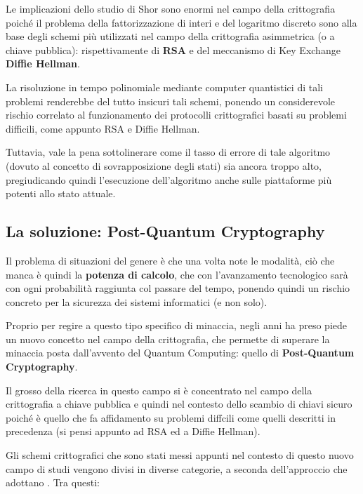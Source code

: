\documentclass[a4paper, 12pt, oneside]{article}
\theoremstyle{definition}
\begin{document}
Le implicazioni dello studio di Shor sono enormi nel campo della crittografia poiché il problema della fattorizzazione di interi e del logaritmo discreto sono alla base degli schemi più utilizzati nel campo della crittografia asimmetrica (o a chiave pubblica): rispettivamente di \textbf{RSA} e del meccanismo di Key Exchange \textbf{Diffie Hellman}.

La risoluzione in tempo polinomiale mediante computer quantistici di tali problemi renderebbe del tutto insicuri tali schemi, ponendo un considerevole rischio correlato al funzionamento dei protocolli crittografici basati su problemi difficili, come appunto RSA e Diffie Hellman.

Tuttavia, vale la pena sottolinerare come il tasso di errore di tale algoritmo (dovuto al concetto di sovrapposizione degli stati) sia ancora troppo alto, pregiudicando quindi l'esecuzione dell'algoritmo anche sulle piattaforme più potenti allo stato attuale.

\newpage

\subsection{La soluzione: Post-Quantum Cryptography}
Il problema di situazioni del genere è che una volta note le modalità, ciò che manca è quindi la \textbf{potenza di calcolo}, che con l'avanzamento tecnologico sarà con ogni probabilità raggiunta col passare del tempo, ponendo quindi un rischio concreto per la sicurezza dei sistemi informatici (e non solo).

Proprio per regire a questo tipo specifico di minaccia, negli anni ha preso piede un nuovo concetto nel campo della crittografia, che permette di superare la minaccia posta dall'avvento del Quantum Computing: quello di \textbf{Post-Quantum Cryptography}.

Il grosso della ricerca in questo campo si è concentrato nel campo della crittografia a chiave pubblica e quindi nel contesto dello scambio di chiavi sicuro poiché è quello che fa affidamento su problemi diffcili come quelli descritti in precedenza (si pensi appunto ad RSA ed a Diffie Hellman).

Gli schemi crittografici che sono stati messi appunti nel contesto di questo nuovo campo di studi vengono divisi in diverse categorie, a seconda dell'approccio che adottano \cite{Bernstein2009}. Tra questi:
\end{document}
